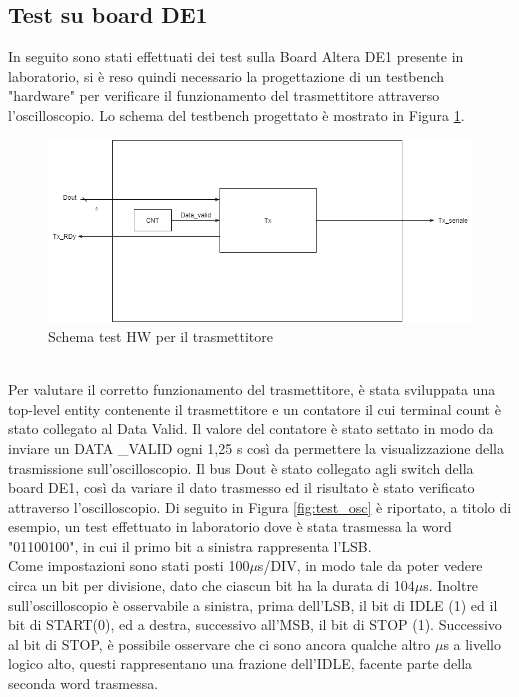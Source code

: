\documentclass[a4paper, titlepage]{article}
\begin{document}
\subsection{Test su board DE1}
In seguito sono stati effettuati dei test sulla Board Altera DE1 presente in laboratorio, si è reso quindi necessario la progettazione di un testbench "hardware" per verificare il funzionamento del trasmettitore attraverso l'oscilloscopio. Lo schema del testbench progettato è mostrato in Figura \ref{fig:my_testTX}.
\begin{figure}[h]
    \centering
    \includegraphics[scale=0.5]{test_tx.png}
    \caption{Schema test HW per il trasmettitore}
    \label{fig:my_testTX}
\end{figure}\\
\noindent Per valutare il corretto funzionamento del trasmettitore, è stata sviluppata una top-level entity contenente il trasmettitore e un contatore il cui terminal count è stato collegato al Data Valid. Il valore del contatore è stato settato in modo da inviare un DATA \_VALID ogni 1,25 s così da permettere la visualizzazione della trasmissione sull'oscilloscopio. Il bus Dout è stato collegato agli switch della board DE1, così da variare il dato trasmesso ed il risultato è stato verificato attraverso l'oscilloscopio. Di seguito in Figura \ref{fig:test_osc} è riportato, a titolo di esempio, un test effettuato in laboratorio dove è stata trasmessa la word "01100100", in cui il primo bit a sinistra rappresenta l'LSB.\\Come impostazioni sono stati posti 100$\mu$s/DIV, in modo tale da poter vedere circa un bit per divisione, dato che ciascun bit ha la durata di 104$\mu$s. Inoltre sull'oscilloscopio è osservabile a sinistra, prima dell'LSB, il bit di IDLE (1) ed il bit di START(0), ed a destra, successivo all'MSB, il bit di STOP (1). Successivo al bit di STOP, è possibile osservare che ci sono ancora qualche altro $\mu$s a livello logico alto, questi rappresentano una frazione dell'IDLE, facente parte della seconda word trasmessa.
\end{document}
